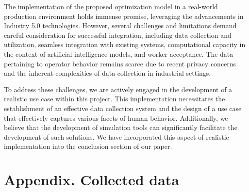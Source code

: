 \documentclass[preprint,11pt,3p]{elsarticle}
\begin{document}
 
\begin{tcolorbox}[colback=r_color1,colframe=r_color2,title=Response Q5:]
The implementation of the proposed optimization model in a real-world production environment holds immense promise, leveraging the advancements in Industry 5.0 technologies. However, several challenges and limitations demand careful consideration for successful integration, including data collection and utilization, seamless integration with existing systems, computational capacity in the context of artificial intelligence models, and worker acceptance. The data pertaining to operator behavior remains scarce due to recent privacy concerns and the inherent complexities of data collection in industrial settings.

To address these challenges, we are actively engaged in the development of a realistic use case within this project. This implementation necessitates the establishment of an effective data collection system and the design of a use case that effectively captures various facets of human behavior. Additionally, we believe that the development of simulation tools can significantly facilitate the development of such solutions.
We have incorporated this aspect of realistic implementation into the conclusion section of our paper.

	
	
	
\end{tcolorbox}

\newpage


%  
 


\section{Appendix. Collected data}

\end{document}
